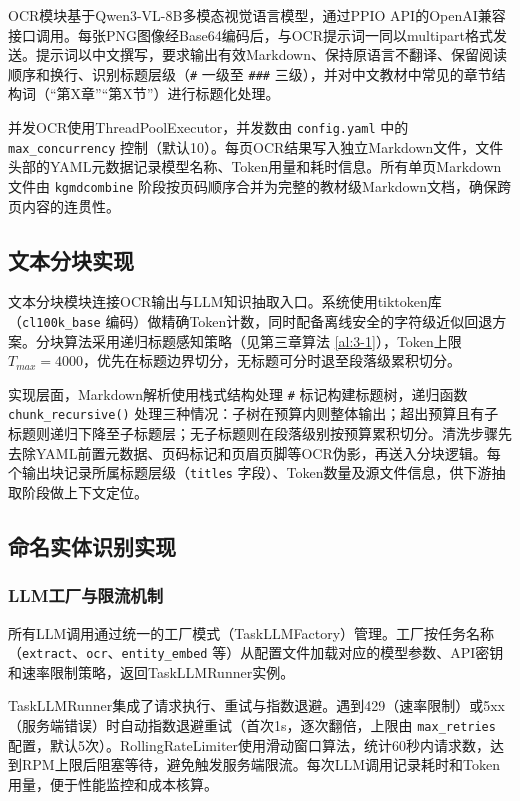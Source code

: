 OCR模块基于Qwen3-VL-8B多模态视觉语言模型，通过PPIO API的OpenAI兼容接口调用。每张PNG图像经Base64编码后，与OCR提示词一同以multipart格式发送。提示词以中文撰写，要求输出有效Markdown、保持原语言不翻译、保留阅读顺序和换行、识别标题层级（\texttt{\#} 一级至 \texttt{\#\#\#} 三级），并对中文教材中常见的章节结构词（“第X章”“第X节”）进行标题化处理。

并发OCR使用ThreadPoolExecutor，并发数由 \texttt{config.yaml} 中的 \texttt{max\_concurrency} 控制（默认10）。每页OCR结果写入独立Markdown文件，文件头部的YAML元数据记录模型名称、Token用量和耗时信息。所有单页Markdown文件由 \texttt{kgmdcombine} 阶段按页码顺序合并为完整的教材级Markdown文档，确保跨页内容的连贯性。

\subsection{文本分块实现}

文本分块模块连接OCR输出与LLM知识抽取入口。系统使用tiktoken库（\texttt{cl100k\_base} 编码）做精确Token计数，同时配备离线安全的字符级近似回退方案。分块算法采用递归标题感知策略（见第三章算法 \ref{al:3-1}），Token上限 $T_{max} = 4000$，优先在标题边界切分，无标题可分时退至段落级累积切分。

实现层面，Markdown解析使用栈式结构处理 \texttt{\#} 标记构建标题树，递归函数 \texttt{chunk\_recursive()} 处理三种情况：子树在预算内则整体输出；超出预算且有子标题则递归下降至子标题层；无子标题则在段落级别按预算累积切分。清洗步骤先去除YAML前置元数据、页码标记和页眉页脚等OCR伪影，再送入分块逻辑。每个输出块记录所属标题层级（\texttt{titles} 字段）、Token数量及源文件信息，供下游抽取阶段做上下文定位。

\subsection{命名实体识别实现}

\subsubsection{LLM工厂与限流机制}

所有LLM调用通过统一的工厂模式（TaskLLMFactory）管理。工厂按任务名称（\texttt{extract}、\texttt{ocr}、\texttt{entity\_embed} 等）从配置文件加载对应的模型参数、API密钥和速率限制策略，返回TaskLLMRunner实例。

TaskLLMRunner集成了请求执行、重试与指数退避。遇到429（速率限制）或5xx（服务端错误）时自动指数退避重试（首次1s，逐次翻倍，上限由 \texttt{max\_retries} 配置，默认5次）。RollingRateLimiter使用滑动窗口算法，统计60秒内请求数，达到RPM上限后阻塞等待，避免触发服务端限流。每次LLM调用记录耗时和Token用量，便于性能监控和成本核算。

